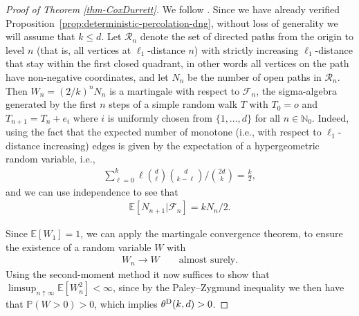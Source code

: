 \documentclass[a4paper, oneside, 11pt]{amsart}
\newcommand{\N}{\mathbb{N}}
\theoremstyle{definition}
\renewcommand{\P}{\mathbb{P}}
\newcommand{\1}{\mathbbm{1}}
\newcommand{\E}{\mathbb{E}}
\newcommand{\0}{\mathbf{o}}
\numberwithin{equation}{section}
\begin{document}
\begin{proof}[Proof of Theorem \ref{thm-CoxDurrett}]
We follow \cite[Section 2]{CoxDurrett}. Since we have already verified Proposition~\ref{prop:deterministic-percolation-dng}, without loss of generality we will assume that $k \leq d$. Let $\mathcal R_n$ denote the set of directed paths from the origin to level $n$ (that is, all vertices at $\ell_1$-distance $n$) with strictly increasing $\ell_1$-distance that stay within the first closed quadrant, in other words all vertices on the path have non-negative coordinates, and let $N_n$ be the number of open paths in $\mathcal R_n$. Then $W_n=(2/k)^nN_n$ is a martingale with respect to $\mathcal F_n$, the sigma-algebra generated by the first $n$ steps of a simple random walk $T$ with $T_0=o$ and $T_{n+1}=T_n+e_i$ where $i$ is uniformly chosen from $\{1,\dots ,d\}$ for all $n\in\N_0$. Indeed, using the fact that the expected number of monotone (i.e., with respect to $\ell_1$-distance increasing) edges  is given by the expectation of a hypergeometric random variable, i.e., 
\begin{align*}
\sum_{\ell=0}^k \ell\binom{d}{\ell}\binom{d}{k-\ell}\Big/\binom{2d}{k}=\frac{k}{2},
\end{align*}
and we can use independence to see that 
\begin{align*}
\E[N_{n+1}|\mathcal F_n]=kN_n/2.
\end{align*}

Since $\E[W_1]=1$, we can apply the martingale convergence theorem, to ensure the existence of a random variable $W$ with 
\begin{align*}
W_n\to W\qquad \text{almost surely}.
\end{align*}
Using the second-moment method it now suffices to show that $\limsup_{n\uparrow\infty}\E[W_n^2]<\infty$, since by the Paley--Zygmund inequality we then have that $\P(W>0)>0$, which implies $\theta^{\rm D}(k,d)>0$.


\end{proof}
\end{document}
